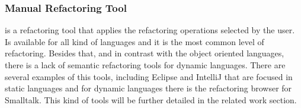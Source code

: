 


\subsubsection{Manual Refactoring Tool}
is a refactoring tool that applies the refactoring operations selected by the user.
Is available for all kind of languages and it is the most common level of refactoring.
Besides that, and in contrast with the object oriented languages, there is a lack of semantic refactoring tools for dynamic languages.
There are several examples of this tools, including Eclipse and IntelliJ that are focused in static languages and for dynamic languages there is the refactoring browser for Smalltalk.
This kind of tools will be further detailed in the related work section.




